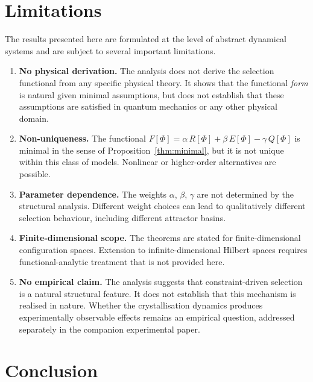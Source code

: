\documentclass[12pt]{article}
\begin{document}
\section{Limitations}\label{sec:limitations}

The results presented here are formulated at the level of abstract dynamical systems and are subject to several important limitations.

\begin{enumerate}
    \item \textbf{No physical derivation.} The analysis does not derive the selection functional from any specific physical theory. It shows that the functional \textit{form} is natural given minimal assumptions, but does not establish that these assumptions are satisfied in quantum mechanics or any other physical domain.

    \item \textbf{Non-uniqueness.} The functional $F[\Phi] = \alpha\, R[\Phi] + \beta\, E[\Phi] - \gamma\, Q[\Phi]$ is minimal in the sense of Proposition~\ref{thm:minimal}, but it is not unique within this class of models. Nonlinear or higher-order alternatives are possible.

    \item \textbf{Parameter dependence.} The weights $\alpha$, $\beta$, $\gamma$ are not determined by the structural analysis. Different weight choices can lead to qualitatively different selection behaviour, including different attractor basins.

    \item \textbf{Finite-dimensional scope.} The theorems are stated for finite-dimensional configuration spaces. Extension to infinite-dimensional Hilbert spaces requires functional-analytic treatment that is not provided here.

    \item \textbf{No empirical claim.} The analysis suggests that constraint-driven selection is a natural structural feature. It does not establish that this mechanism is realised in nature. Whether the crystallisation dynamics produces experimentally observable effects remains an empirical question, addressed separately in the companion experimental paper.
\end{enumerate}

\section{Conclusion}
\end{document}
